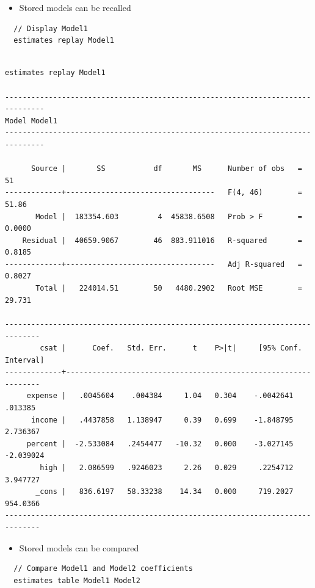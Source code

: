 \documentclass[]{book}
\providecommand{\tightlist}{%
  \setlength{\itemsep}{0pt}\setlength{\parskip}{0pt}}
\begin{document}
\begin{itemize}
\tightlist
\item
  Stored models can be recalled
\end{itemize}

\begin{verbatim}
  // Display Model1
  estimates replay Model1
\end{verbatim}

\begin{verbatim}

estimates replay Model1

-------------------------------------------------------------------------------
Model Model1
-------------------------------------------------------------------------------

      Source |       SS           df       MS      Number of obs   =        51
-------------+----------------------------------   F(4, 46)        =     51.86
       Model |  183354.603         4  45838.6508   Prob > F        =    0.0000
    Residual |  40659.9067        46  883.911016   R-squared       =    0.8185
-------------+----------------------------------   Adj R-squared   =    0.8027
       Total |   224014.51        50   4480.2902   Root MSE        =    29.731

------------------------------------------------------------------------------
        csat |      Coef.   Std. Err.      t    P>|t|     [95% Conf. Interval]
-------------+----------------------------------------------------------------
     expense |   .0045604    .004384     1.04   0.304    -.0042641     .013385
      income |   .4437858   1.138947     0.39   0.699    -1.848795    2.736367
     percent |  -2.533084   .2454477   -10.32   0.000    -3.027145   -2.039024
        high |   2.086599   .9246023     2.26   0.029     .2254712    3.947727
       _cons |   836.6197   58.33238    14.34   0.000     719.2027    954.0366
------------------------------------------------------------------------------
\end{verbatim}

\begin{itemize}
\tightlist
\item
  Stored models can be compared
\end{itemize}

\begin{verbatim}
  // Compare Model1 and Model2 coefficients
  estimates table Model1 Model2
\end{verbatim}
\end{document}
